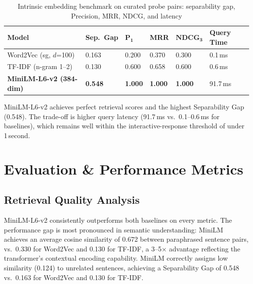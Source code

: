 \documentclass[12pt,a4paper]{article}
\begin{document}
\begin{table}[htbp]
\centering
\caption{Intrinsic embedding benchmark on curated probe pairs: separability gap, Precision, MRR, NDCG, and latency}
\label{tab:benchmark}
\setlength{\tabcolsep}{8pt}
\renewcommand{\arraystretch}{1.2}
\begin{tabular}{L{4.0cm} C{1.8cm} C{1.3cm} C{1.3cm} C{1.8cm} C{2.1cm}}
\toprule
\textbf{Model} & \textbf{Sep.~Gap} & $\boldsymbol{P_1}$ & \textbf{MRR} & $\boldsymbol{\text{NDCG}_3}$ & \textbf{Query Time} \\
\midrule
Word2Vec (sg, $d$=100)          & 0.163 & 0.200 & 0.370 & 0.300 & 0.1\,ms \\
TF-IDF (n-gram 1--2)            & 0.130 & 0.600 & 0.658 & 0.600 & 0.6\,ms \\
\textbf{MiniLM-L6-v2 (384-dim)} & \textbf{0.548} & \textbf{1.000} & \textbf{1.000} & \textbf{1.000} & 91.7\,ms \\
\bottomrule
\end{tabular}
\end{table}

MiniLM-L6-v2 achieves perfect retrieval scores and the highest Separability Gap (0.548). The trade-off is higher query latency (91.7\,ms vs.\ 0.1--0.6\,ms for baselines), which remains well within the interactive-response threshold of under 1\,second.

\section{Evaluation \& Performance Metrics}

\subsection{Retrieval Quality Analysis}

MiniLM-L6-v2 consistently outperforms both baselines on every metric. The performance gap is most pronounced in semantic understanding: MiniLM achieves an average cosine similarity of 0.672 between paraphrased sentence pairs, vs.\ 0.330 for Word2Vec and 0.130 for TF-IDF, a 3--5$\times$ advantage reflecting the transformer's contextual encoding capability. MiniLM correctly assigns low similarity (0.124) to unrelated sentences, achieving a Separability Gap of 0.548 vs.\ 0.163 for Word2Vec and 0.130 for TF-IDF.
\end{document}
